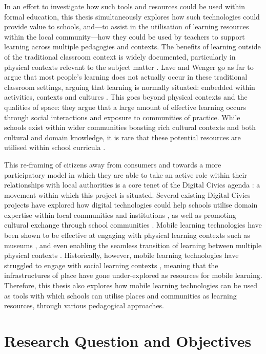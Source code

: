 In an effort to investigate how such tools and resources could be used within formal education, this thesis simultaneously explores how such technologies could provide value to schools, and---to assist in the utilisation of learning resources within the local community---how they could be used by teachers to support learning across multiple pedagogies and contexts. The benefits of learning outside of the traditional classroom context is widely documented, particularly in physical contexts relevant to the subject matter \citep{Fiennes2015, Ofsted2008}. Lave and Wenger go as far to argue that most people's learning does not actually occur in these traditional classroom settings, arguing that learning is normally situated: embedded within activities, contexts and cultures \citep{lave1991situated}. This goes beyond physical contexts and the qualities of space: they argue that a large amount of effective learning occurs through social interactions and exposure to communities of practice. While schools exist within wider communities boasting rich cultural contexts and both cultural and domain knowledge, it is rare that these potential resources are utilised within school curricula \citep{Leat2015}. 

This re-framing of citizens away from consumers and towards a more participatory model in which they are able to take an active role within their relationships with local authorities is a core tenet of the Digital Civics agenda \citep{Olivier2015}: a movement within which this project is situated. Several existing Digital Civics projects have explored how digital technologies could help schools utilise domain expertise within local communities \citep{Dodds2017} and institutions \citep{Megan2019}, as well as promoting cultural exchange through school communities \citep{Sarangapani2016}. Mobile learning technologies have been shown to be effective at engaging with physical learning contexts such as museums \citep{Lonsdale2004}, and even enabling the seamless transition of learning between multiple physical contexts \citep{Wong2011}. Historically, however, mobile learning technologies have struggled to engage with social learning contexts  \citep{Frohberg2009}, meaning that the infrastructures of place have gone under-explored as resources for mobile learning. Therefore, this thesis also explores how mobile learning technologies can be used as tools with which schools can utilise places and communities as learning resources, through various pedagogical approaches.


\section{Research Question and Objectives}
\label{sec:ResearchQuestions}

